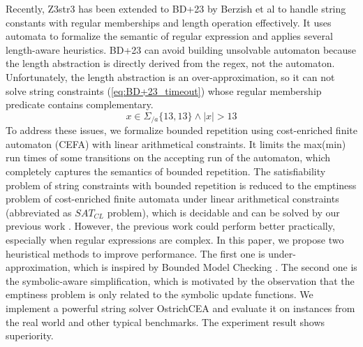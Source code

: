 {Recently, Z3str3 has been extended to BD+23\cite{BD+23} by Berzish et al to handle string constants with regular memberships and length operation effectively. It uses automata to formalize the semantic of regular expression and applies several length-aware heuristics. BD+23 can avoid building unsolvable automaton because the length abstraction is directly derived from the regex, not the automaton. Unfortunately, the length abstraction is an over-approximation, so it can not solve string constraints (\ref{eq:BD+23_timeout}) whose regular membership predicate contains complementary.
\begin{equation}\label{eq:BD+23_timeout}
  x\in \Sigma_{/a}\{13,13\}\wedge |x| > 13
\end{equation}
To address these issues, we formalize bounded repetition using cost-enriched finite automaton (CEFA)\cite{atva2020} with linear arithmetical constraints. It limits the max(min) run times of some transitions on the accepting run of the automaton, which completely captures the semantics of bounded repetition. The satisfiability problem of string constraints with bounded repetition is reduced to the emptiness problem of cost-enriched finite automata under linear arithmetical constraints (abbreviated as $SAT_{CL}$ problem), which is decidable and can be solved by our previous work \cite{atva2020}. However, the previous work could perform better practically, especially when regular expressions are complex. In this paper, we propose two heuristical methods to improve performance. The first one is under-approximation, which is inspired by Bounded Model Checking \cite{bmc_1}\cite{bmc_2}\cite{bmc_3}. The second one is the symbolic-aware simplification, which is motivated by the observation that the emptiness problem is only related to the symbolic update functions. We implement a powerful string solver OstrichCEA and evaluate it on instances from the real world and other typical benchmarks. The experiment result shows superiority.

}
